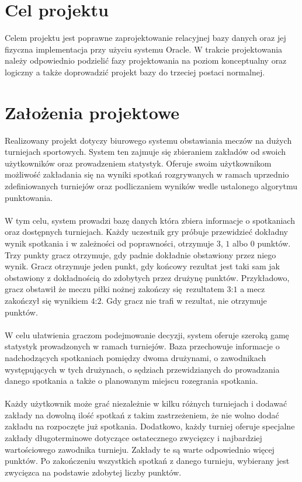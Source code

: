 \documentclass{mwrep}
\begin{document}
\section{Cel projektu}
Celem projektu jest poprawne zaprojektowanie relacyjnej bazy danych oraz jej
fizyczna implementacja przy użyciu systemu Oracle. W trakcie projektowania należy
odpowiednio podzielić fazy projektowania na poziom konceptualny oraz logiczny a także 
doprowadzić projekt bazy do trzeciej postaci normalnej.

\section{Założenia projektowe}
Realizowany projekt dotyczy biurowego systemu obstawiania meczów
na dużych turniejach sportowych. System ten zajmuje się zbieraniem 
zakładów od swoich użytkowników oraz prowadzeniem statystyk. 
Oferuje swoim użytkownikom możliwość zakładania się na wyniki spotkań
rozgrywanych w ramach uprzednio zdefiniowanych turniejów oraz podliczaniem 
wyników wedle ustalonego algorytmu punktowania.
\\ 
\\
\indent W tym celu, system prowadzi bazę danych która zbiera informacje o spotkaniach
oraz dostępnych turniejach. Każdy uczestnik gry próbuje przewidzieć dokładny wynik 
spotkania i w zależności od poprawności, otrzymuje $3$, $1$ albo $0$ punktów.
Trzy punkty gracz otrzymuje, gdy padnie dokładnie obstawiony przez niego wynik.
Gracz otrzymuje jeden punkt, gdy końcowy rezultat jest taki sam jak obstawiony z dokładnością
do zdobytych przez drużynę punktów. Przykładowo, gracz obstawił że meczu piłki
nożnej zakończy się rezultatem $3$:$1$ a mecz zakończył się wynikiem $4$:$2$. 
Gdy gracz nie trafi w rezultat, nie otrzymuje punktów.  
\\
\\
\indent W celu ułatwienia graczom podejmowanie decyzji, system oferuje szeroką gamę statystyk 
prowadzonych w ramach turniejów. Baza przechowuje informacje o nadchodzących spotkaniach 
pomiędzy dwoma drużynami, o zawodnikach występujących w tych drużynach, o sędziach 
przewidzianych do prowadzania danego spotkania a także o planowanym miejscu rozegrania spotkania.  
\\
\\
\indent Każdy użytkownik może grać niezależnie w kilku różnych turniejach i dodawać zakłady 
na dowolną ilość spotkań z takim zastrzeżeniem, że nie wolno dodać zakładu na 
rozpoczęte już spotkania. Dodatkowo, każdy turniej oferuje specjalne zakłady długoterminowe
dotyczące ostatecznego zwycięzcy i najbardziej wartościowego zawodnika turnieju. Zakłady 
te są warte odpowiednio więcej punktów. Po zakończeniu wszystkich spotkań z danego turnieju, wybierany 
jest zwycięzca na podstawie zdobytej liczby punktów. 
\end{document}
